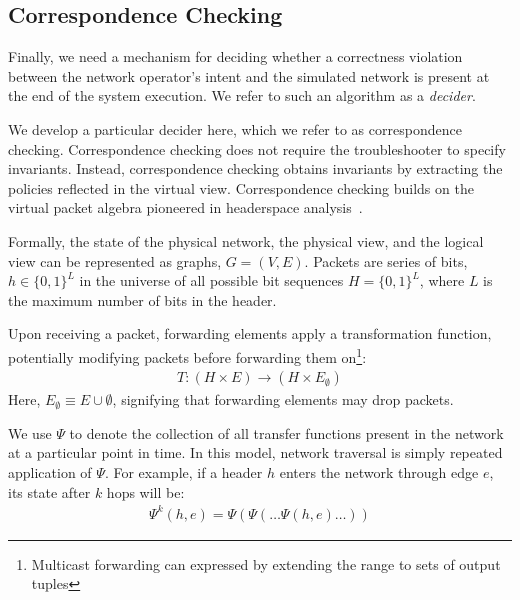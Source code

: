{%

\subsection{Correspondence Checking}

Finally, we need a mechanism for deciding
whether a correctness violation between the network operator's intent and the simulated network
is present at the end of the system execution.
We refer to such an algorithm as a {\em decider}.

We develop a particular decider here, which we refer to as correspondence checking.
Correspondence checking does not require
the troubleshooter to specify invariants. Instead, correspondence checking
obtains invariants by extracting the policies reflected in the virtual view.
Correspondence checking builds on the virtual packet algebra
pioneered in headerspace analysis~\cite{hsa}.


Formally, the state of the physical network, the physical view, and the
logical view can be represented as graphs,
$G = (V, E)$. Packets are series of bits, $h \in \{0,1\}^L$ in the universe
of all possible bit sequences $H = \{0,1\}^L$,
where $L$ is the maximum number of bits in the header.

Upon receiving a packet,
forwarding elements apply a transformation function, potentially modifying
packets before forwarding them on\footnote{Multicast forwarding can expressed
by extending the range to sets of output tuples}:
\begin{align*}
T: (H \times E) \rightarrow (H \times E_{\emptyset})
\end{align*}
Here, $E_{\emptyset} \equiv E \cup \emptyset$, signifying that forwarding elements
may drop packets.

We use $\Psi$ to denote the collection of all transfer functions present in
the network at a particular point in time. In this model, network traversal is
simply repeated application of $\Psi$.
For example, if a header $h$ enters the network through edge
$e$, its state after $k$ hops will be:
\begin{align*}
\Psi^k(h,e) = \Psi(\Psi(\dots \Psi(h,e)\dots))
\end{align*}

}
